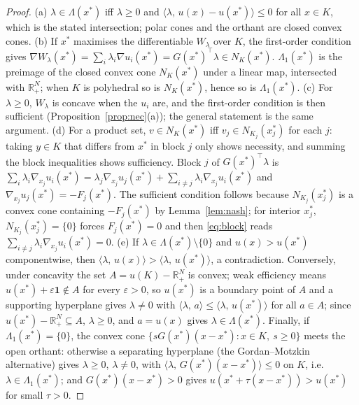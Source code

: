 \documentclass[11pt,a4paper]{article}
\theoremstyle{plain}
\theoremstyle{definition}
\theoremstyle{remark}
\newcommand{\R}{\mathbb{R}}
\newcommand{\NC}{N}
\newcommand{\ip}[2]{\langle #1,\,#2\rangle}
\newcommand{\Lam}{\Lambda}
\newcommand{\Lone}{\Lambda_{1}}
\begin{document}
\begin{proof}
(a) $\lambda\in\Lam(x^*)$ iff $\lambda\ge 0$ and $\ip{\lambda}{u(x)-u(x^*)}\le 0$ for all $x\in K$, which is the stated intersection; polar cones and the orthant are closed convex cones.
(b) If $x^*$ maximises the differentiable $W_\lambda$ over $K$, the first-order condition gives $\nabla W_\lambda(x^*)=\sum_i\lambda_i\nabla u_i(x^*)=G(x^*)^{\!\top}\lambda\in\NC_K(x^*)$. $\Lone(x^*)$ is the preimage of the closed convex cone $\NC_K(x^*)$ under a linear map, intersected with $\R^N_+$; when $K$ is polyhedral so is $\NC_K(x^*)$, hence so is $\Lone(x^*)$.
(c) For $\lambda\ge 0$, $W_\lambda$ is concave when the $u_i$ are, and the first-order condition is then sufficient (Proposition~\ref{prop:nec}(a)); the general statement is the same argument.
(d) For a product set, $v\in\NC_K(x^*)$ iff $v_j\in\NC_{K_j}(x_j^*)$ for each $j$: taking $y\in K$ that differs from $x^*$ in block $j$ only shows necessity, and summing the block inequalities shows sufficiency. Block $j$ of $G(x^*)^{\!\top}\lambda$ is $\sum_i\lambda_i\nabla_{x_j}u_i(x^*)=\lambda_j\nabla_{x_j}u_j(x^*)+\sum_{i\ne j}\lambda_i\nabla_{x_j}u_i(x^*)$ and $\nabla_{x_j}u_j(x^*)=-F_j(x^*)$. The sufficient condition follows because $\NC_{K_j}(x_j^*)$ is a convex cone containing $-F_j(x^*)$ by Lemma~\ref{lem:nash}; for interior $x_j^*$, $\NC_{K_j}(x_j^*)=\{0\}$ forces $F_j(x^*)=0$ and then \eqref{eq:block} reads $\sum_{i\ne j}\lambda_i\nabla_{x_j}u_i(x^*)=0$.
(e) If $\lambda\in\Lam(x^*)\setminus\{0\}$ and $u(x)>u(x^*)$ componentwise, then $\ip{\lambda}{u(x)}>\ip{\lambda}{u(x^*)}$, a contradiction. Conversely, under concavity the set $A=u(K)-\R^N_+$ is convex; weak efficiency means $u(x^*)+\varepsilon\mathbf 1\notin A$ for every $\varepsilon>0$, so $u(x^*)$ is a boundary point of $A$ and a supporting hyperplane gives $\lambda\ne 0$ with $\ip{\lambda}{a}\le\ip{\lambda}{u(x^*)}$ for all $a\in A$; since $u(x^*)-\R^N_+\subseteq A$, $\lambda\ge 0$, and $a=u(x)$ gives $\lambda\in\Lam(x^*)$. Finally, if $\Lone(x^*)=\{0\}$, the convex cone $\{sG(x^*)(x-x^*):x\in K,\ s\ge0\}$ meets the open orthant: otherwise a separating hyperplane (the Gordan--Motzkin alternative) gives $\lambda\ge0$, $\lambda\ne0$, with $\ip{\lambda}{G(x^*)(x-x^*)}\le0$ on $K$, i.e.\ $\lambda\in\Lone(x^*)$; and $G(x^*)(x-x^*)>0$ gives $u(x^*+\tau(x-x^*))>u(x^*)$ for small $\tau>0$.
\end{proof}
\end{document}
